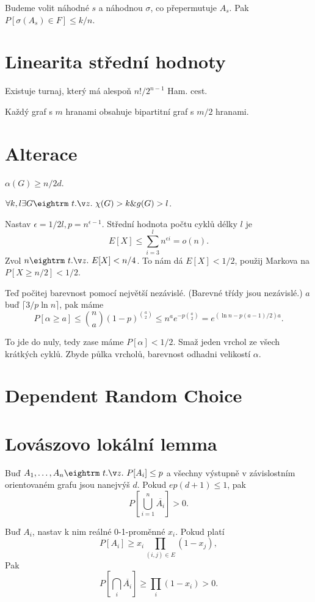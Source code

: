  Budeme volit náhodné $s$ a náhodnou $\sigma$, co přepermutuje
$A_s$. Pak $P[\sigma(A_s) \in F] \le k/n$.

\section{Linearita střední hodnoty}

\thm{} Existuje turnaj, který má alespoň $n!/2^{n-1}$ Ham. cest.

\thm{} Každý graf s $m$ hranami obsahuje bipartitní graf s $m/2$ hranami.

\section{Alterace}

 $\alpha(G) \ge n/2d$.

\prf{}

 $\forall k,l \exists G \st \chi(G) > k \& g(G) > l$.

\prf{} Nastav $\epsilon = 1/2l, p = n^{\epsilon-1}$. Střední hodnota počtu cyklů
délky $l$ je $$E[X] \le \sum_{i=3}^l n^{\epsilon i} = o(n).$$
Zvol $n \st E[X] < n/4$. To nám dá $E[X] < 1/2$, použij Markova na $P[X \ge n/2] < 1/2$.

Teď počitej barevnost pomocí největší nezávislé. (Barevné třídy jsou
nezávislé.) $a$ buď $\lceil 3/p \ln n \rceil$, pak máme
$$P[\alpha \ge a] \le {n \choose a} (1-p)^{{a \choose 2}} \le n^a e^{-p{a \choose 2}} =
e^{(\ln n -p(a-1)/2)a}.$$

To jde do nuly, tedy zase máme $P[\alpha] < 1/2$. Smaž jeden vrchol ze všech krátkých cyklů.
Zbyde půlka vrcholů, barevnost odhadni velikostí $\alpha$.

\section{Dependent Random Choice}

\section{Lovászovo lokální lemma}

 Buď $A_1, \dots, A_n \st P[A_i] \le p$ a všech\-ny vý\-stup\-ně v zá\-vi\-slostním
orientovaném grafu jsou nanejvýš $d$. Pokud $ep(d+1) \le 1$, pak 
$$P[\bigcup_{i=1}^n \overline{A_i}] > 0.$$

\prf{} Buď $A_i$, nastav k nim reálné 0-1-proměnné $x_i$. Pokud platí
$$P[A_i] \ge x_i \prod_{(i,j) \in E} (1-x_j), $$
Pak
$$P[\bigcap_i \overline{A_i}] \ge \prod_i (1-x_i) > 0.$$

